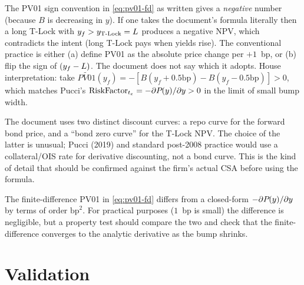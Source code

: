 \documentclass[11pt,a4paper]{article}
\begin{document}
\begin{commentary}
The PV01 sign convention in \eqref{eq:pv01-fd} as written gives a
\emph{negative} number (because $B$ is decreasing in $y$). If one
takes the document's formula literally then a long T-Lock with $y_f >
y_{\text{T-Lock}} = L$ produces a negative NPV, which contradicts
the intent (long T-Lock pays when yields rise). The conventional
practice is either (a) define PV01 as the absolute price change per
$+1$~bp, or (b) flip the sign of $(y_f - L)$. The document does
not say which it adopts. House interpretation: take
$\widetilde{PV01}(y_f) = -[B(y_f + 0.5\text{bp}) - B(y_f - 0.5\text{bp})] > 0$,
which matches Pucci's $\mathrm{RiskFactor}_{t_e} = -\partial P_{}(y)/\partial y > 0$
in the limit of small bump width.
\end{commentary}

\begin{commentary}
The document uses two distinct discount curves: a repo curve for the
forward bond price, and a ``bond zero curve'' for the T-Lock NPV.
The choice of the latter is unusual; Pucci (2019) and standard
post-2008 practice would use a collateral/OIS rate for derivative
discounting, not a bond curve. This is the kind of detail that should
be confirmed against the firm's actual CSA before using the formula.
\end{commentary}

\begin{commentary}
The finite-difference PV01 in \eqref{eq:pv01-fd} differs from a
closed-form $-\partial P_{}(y)/\partial y$ by terms of order
$\text{bp}^2$. For practical purposes ($1$~bp is small) the difference
is negligible, but a property test should compare the two and check
that the finite-difference converges to the analytic derivative as
the bump shrinks.
\end{commentary}

\section{Validation}
\end{document}
